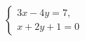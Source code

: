 \begin{ex}
	\begin{condition}
		\( \left\{
		\begin{array}{l}
			3x-4y=7,\\
			x+2y+1=0
		\end{array}
		\right. \)
	\end{condition}
\end{ex}